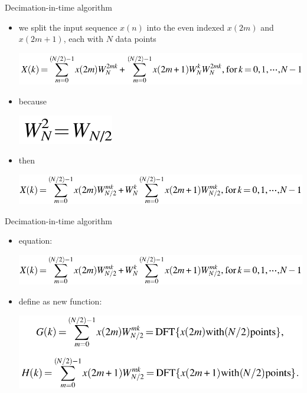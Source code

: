 \documentclass[pdflatex,compress,mathserif]{beamer}
\begin{document}
\begin{frame}{Decimation-in-time algorithm}
	\begin{itemize}
		\item we split the input sequence $x(n)$ into the even indexed $x(2m)$ and $x(2m + 1)$, each with $N$ data points
		\begin{center}
			\includegraphics[width=\linewidth]{img/img20}
		\end{center}
		\item because
		\begin{center}
			\includegraphics[width=0.2\linewidth]{img/img21}
		\end{center}
		\item then
		\begin{center}
			\includegraphics[width=\linewidth]{img/img22}
		\end{center}
	\end{itemize}
\end{frame}

\begin{frame}{Decimation-in-time algorithm}
	\begin{itemize}
		\item equation:
		\begin{center}
			\includegraphics[width=\linewidth]{img/img22}
		\end{center}
		\item define as new function:
		\begin{center}
			\includegraphics[width=\linewidth]{img/img23}
		\end{center}
	\end{itemize}
\end{frame}
\end{document}
